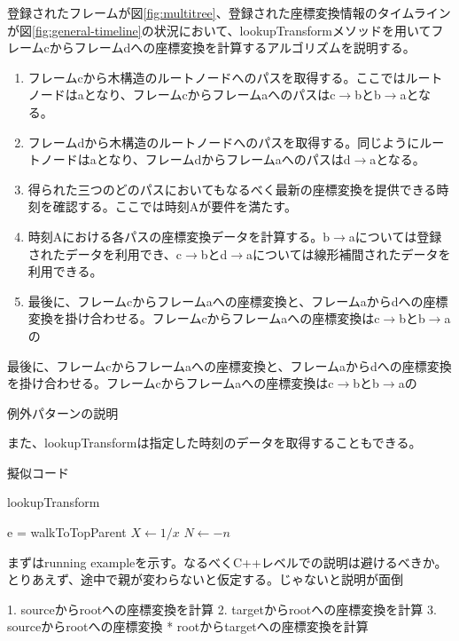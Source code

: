 \documentclass[a4paper]{jreport}	%
\begin{document}
登録されたフレームが図\ref{fig:multitree}、登録された座標変換情報のタイムラインが図\ref{fig:general-timeline}の状況において、lookupTransformメソッドを用いてフレームcからフレームdへの座標変換を計算するアルゴリズムを説明する。

\begin{enumerate}
	\item フレームcから木構造のルートノードへのパスを取得する。ここではルートノードはaとなり、フレームcからフレームaへのパスはc$\rightarrow$bとb$\rightarrow$aとなる。
	\item フレームdから木構造のルートノードへのパスを取得する。同じようにルートノードはaとなり、フレームdからフレームaへのパスはd$\rightarrow$aとなる。
	\item 得られた三つのどのパスにおいてもなるべく最新の座標変換を提供できる時刻を確認する。ここでは時刻Aが要件を満たす。
	\item 時刻Aにおける各パスの座標変換データを計算する。b$\rightarrow$aについては登録されたデータを利用でき、c$\rightarrow$bとd$\rightarrow$aについては線形補間されたデータを利用できる。
	\item 最後に、フレームcからフレームaへの座標変換と、フレームaからdへの座標変換を掛け合わせる。フレームcからフレームaへの座標変換はc$\rightarrow$bとb$\rightarrow$aの
\end{enumerate}



最後に、フレームcからフレームaへの座標変換と、フレームaからdへの座標変換を掛け合わせる。フレームcからフレームaへの座標変換はc$\rightarrow$bとb$\rightarrow$aの



例外パターンの説明

また、lookupTransformは指定した時刻のデータを取得することもできる。



擬似コード

\begin{algorithm}[H]
	\caption{lookupTransform}
	\begin{algorithmic}
	\STATE e = walkToTopParent
	\STATE $X \leftarrow 1 / x$
    \STATE $N \leftarrow -n$
    \ENDIF
	\end{algorithmic}
\end{algorithm}


まずはrunning exampleを示す。なるべくC++レベルでの説明は避けるべきか。
とりあえず、途中で親が変わらないと仮定する。じゃないと説明が面倒

1. sourceからrootへの座標変換を計算
2. targetからrootへの座標変換を計算
3. sourceからrootへの座標変換 * rootからtargetへの座標変換を計算
\end{document}
